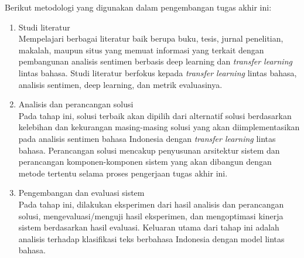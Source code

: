 Berikut metodologi yang digunakan dalam pengembangan tugas akhir ini:
\begin{enumerate}
	\item Studi literatur \\
	Mempelajari berbagai literatur baik berupa buku, tesis, jurnal penelitian, makalah, maupun situs yang memuat informasi yang terkait dengan pembangunan analisis sentimen berbasis deep learning dan \textit{transfer learning} lintas bahasa. Studi literatur berfokus kepada \textit{transfer learning} lintas bahasa, analisis sentimen, deep learning, dan metrik evaluasinya.

	\item Analisis dan perancangan solusi \\
	Pada tahap ini, solusi terbaik akan dipilih dari alternatif solusi berdasarkan kelebihan dan kekurangan masing-masing solusi yang akan diimplementasikan pada analisis sentimen bahasa Indonesia dengan \textit{transfer learning} lintas bahasa. Perancangan solusi mencakup penyusunan arsitektur sistem dan perancangan komponen-komponen sistem yang akan dibangun dengan metode tertentu selama proses pengerjaan tugas akhir ini.

	\item Pengembangan dan evaluasi sistem \\
	Pada tahap ini, dilakukan eksperimen dari hasil analisis dan perancangan solusi, mengevaluasi/menguji  hasil eksperimen, dan mengoptimasi kinerja sistem berdasarkan hasil evaluasi. Keluaran utama dari tahap ini adalah analisis terhadap klasifikasi teks berbahasa Indonesia dengan model lintas bahasa.
\end{enumerate}

